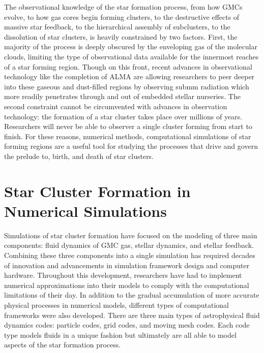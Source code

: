 \documentclass[twoside]{drexel-thesis}
\begin{document}
\begin{thesis}
The observational knowledge of the star formation process, from how GMCs evolve, to how gas cores begin forming clusters, to the destructive effects of massive star feedback, to the hierarchical assembly of subclusters, to the dissolution of star clusters, is heavily constrained by two factors. First, the majority of the process is deeply obscured by the enveloping gas of the molecular clouds, limiting the type of observational data available for the innermost reaches of a star forming region. Though on this front, recent advances in observational technology like the completion of ALMA are allowing researchers to peer deeper into these gaseous and dust-filled regions by observing submm radiation which more readily penetrates through and out of embedded stellar nurseries. The second constraint cannot be circumvented with advances in observation technology: the formation of a star cluster takes place over millions of years. Researchers will never be able to observer a single cluster forming from start to finish. For these reasons, numerical methods, computational simulations of star forming regions are a useful tool for studying the processes that drive and govern the prelude to, birth, and death  of star clusters.


\section{Star Cluster Formation in Numerical Simulations}

Simulations of star cluster formation have focused on the modeling of three main components: fluid dynamics of GMC gas, stellar dynamics, and stellar feedback. Combining these three components into a single simulation has required decades of innovation and advancements in simulation framework design and computer hardware. Throughout this development, researchers have had to implement numerical approximations into their models to comply with the computational limitations of their day. In addition to the gradual accumulation of more accurate physical processes in numerical models, different types of computational frameworks were also developed. There are three main types of astrophysical fluid dynamics codes: particle codes, grid codes, and moving mesh codes. Each code type models fluids in a unique fashion but ultimately are all able to model aspects of the star formation process.


\end{thesis}
\end{document}

